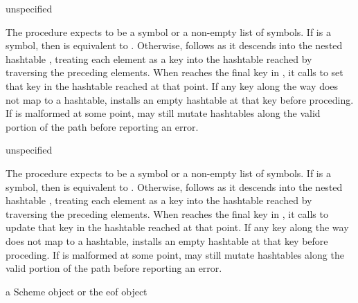 \begin{procedure}
\end{procedure}
\returns{} unspecified

The  procedure expects  to be a symbol or
a non-empty list of symbols.
If  is a symbol, then  is equivalent
to .
Otherwise,  follows  as it descends into
the nested hashtable , treating each element as a key into
the hashtable reached by traversing the preceding elements.
When  reaches the final key in ,
it calls  to set that key in the
hashtable reached at that point.
If any key along the way does not map to a hashtable,
 installs an empty hashtable at that key
before proceding.
If  is malformed at some point,  may
still mutate hashtables along the valid portion of the path
before reporting an error.

\begin{procedure}
\end{procedure}
\returns{} unspecified

The  procedure expects  to be a symbol or
a non-empty list of symbols.
If  is a symbol, then  is equivalent
to .
Otherwise,  follows  as it descends into
the nested hashtable , treating each element as a key into
the hashtable reached by traversing the preceding elements.
When  reaches the final key in ,
it calls  to update that key in the
hashtable reached at that point.
If any key along the way does not map to a hashtable,
 installs an empty hashtable at that key
before proceding.
If  is malformed at some point,  may
still mutate hashtables along the valid portion of the path
before reporting an error.

\label{json:read-options}
\begin{procedure}
\end{procedure}
\returns{} a Scheme object or the eof object

